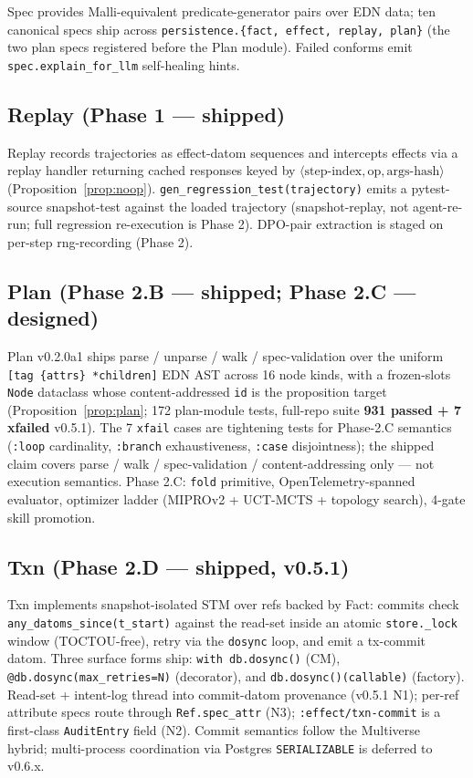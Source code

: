 \documentclass[anon]{nesy2026}   %
\newcommand{\C}[1]{\texttt{#1}}
\begin{document}
Spec provides Malli-equivalent predicate-generator pairs over EDN data; ten canonical specs ship across \C{persistence.\{fact, effect, replay, plan\}} (the two plan specs registered before the Plan module). Failed conforms emit \C{spec.explain\_for\_llm} self-healing hints.

\subsection{Replay (Phase 1 --- shipped)}\label{sec:impl-replay}

Replay records trajectories as effect-datom sequences and intercepts effects via a replay handler returning cached responses keyed by $\langle \text{step-index}, \text{op}, \text{args-hash} \rangle$ (Proposition~\ref{prop:noop}). \C{gen\_regression\_test(trajectory)} emits a pytest-source snapshot-test against the loaded trajectory (snapshot-replay, not agent-re-run; full regression re-execution is Phase 2). DPO-pair extraction is staged on per-step rng-recording (Phase 2).

\subsection{Plan (Phase 2.B --- shipped; Phase 2.C --- designed)}\label{sec:impl-plan}

Plan v0.2.0a1 ships parse / unparse / walk / spec-validation over the uniform \C{[tag \{attrs\} *children]} EDN AST across 16 node kinds, with a frozen-slots \C{Node} dataclass whose content-addressed \C{id} is the proposition target (Proposition~\ref{prop:plan}; 172 plan-module tests, full-repo suite \textbf{931 passed + 7 xfailed} v0.5.1). The 7 \C{xfail} cases are tightening tests for Phase-2.C semantics (\C{:loop} cardinality, \C{:branch} exhaustiveness, \C{:case} disjointness); the shipped claim covers parse / walk / spec-validation / content-addressing only --- not execution semantics. Phase 2.C: \C{fold} primitive, OpenTelemetry-spanned evaluator, optimizer ladder (MIPROv2 + UCT-MCTS + topology search), 4-gate skill promotion.

\subsection{Txn (Phase 2.D --- shipped, v0.5.1)}\label{sec:impl-txn}

Txn implements snapshot-isolated STM over refs backed by Fact: commits check \C{any\_datoms\_since(t\_start)} against the read-set inside an atomic \C{store.\_lock} window (TOCTOU-free), retry via the \C{dosync} loop, and emit a tx-commit datom. Three surface forms ship: \C{with db.dosync()} (CM), \C{@db.dosync(max\_retries=N)} (decorator), and \C{db.dosync()(callable)} (factory). Read-set + intent-log thread into commit-datom provenance (v0.5.1 N1); per-ref attribute specs route through \C{Ref.spec\_attr} (N3); \C{:effect/txn-commit} is a first-class \C{AuditEntry} field (N2). Commit semantics follow the Multiverse~\citep{bieniusa2026multiverse} hybrid; multi-process coordination via Postgres \texttt{SERIALIZABLE} is deferred to v0.6.x.
\end{document}
